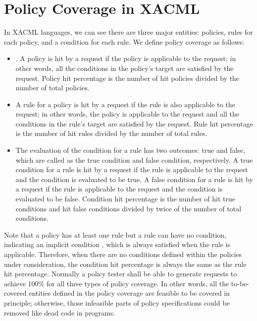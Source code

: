 


\section{Policy Coverage in XACML}
\label{sec:coverage}

In XACML languages, we can see there are three major entities:
policies, rules for each policy, and a condition for each rule. We
define policy coverage as follows:

\begin{itemize}

\item {}. A policy is hit by a request
if the policy is applicable to the request; in other words, all the
conditions in the policy's target are satisfied by the request.
Policy hit percentage is the number of hit policies divided by the
number of total policies.

\item {} A rule for a policy is hit by a
request if the rule is also applicable to the request; in other
words, the policy is applicable to the request and all the
conditions in the rule's target are satisfied by the request. Rule
hit percentage is the number of hit rules divided by the number of
total rules.

\item {} The evaluation of the
condition for a rule has two outcomes: true and false, which are
called as the true condition and false condition, respectively. A
true condition for a rule is hit by a request if the rule is
applicable to the request and the condition is evaluated to be true.
A false condition for a rule is hit by a request if the rule is
applicable to the request and the condition is evaluated to be
false. Condition hit percentage is the number of hit true conditions
and hit false conditions divided by twice of the number of total
conditions.

\end{itemize}

Note that a policy has at least one rule but a rule can have no
condition, indicating an implicit condition , which is
always satisfied when the rule is applicable. Therefore, when there
are no conditions defined within the policies under consideration,
the condition hit percentage is always the same as the rule hit
percentage. Normally a policy tester shall be able to generate
requests to achieve 100\% for all three types of policy coverage. In
other words, all the to-be-covered entities defined in the policy
coverage are feasible to be covered in principle; otherwise, those
infeasible parts of policy specifications could be removed like dead
code in programs.

